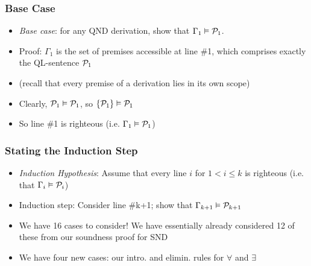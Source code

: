 \begin{frame}
\frametitle{Base Case}

\begin{itemize}

\item \emph{Base case}: for any QND derivation, show that $\Gamma_1 \vDash \mathcal{P}_1$.

\item Proof: $\Gamma_1$ is the set of premises accessible at line \#1, which comprises exactly the QL-sentence $\mathcal{P}_1$ 

\item (recall that every premise of a derivation lies in its own scope)

\item Clearly, $\mathcal{P}_1 \vDash \mathcal{P}_1 $, so $\{ \mathcal{P}_1 \} \vDash \mathcal{P}_1$

\item So line \#1 is righteous (i.e. $\Gamma_1 \vDash \mathcal{P}_1$)

\end{itemize}
\end{frame}

\begin{frame}
\frametitle{Stating the Induction Step}

\begin{itemize}

\item  \emph{Induction Hypothesis}: Assume that every line $i$ for $1 < i \leq k$ is righteous (i.e. that $\Gamma_i \vDash \mathcal{P}_i $)

\item Induction step: Consider line \#k+1; show that $\Gamma_{k+1} \vDash \mathcal{P}_{k+1}$

\item We have 16 cases to consider! We have essentially already considered 12 of these from our soundness proof for SND

\item We have four new cases: our intro. and elimin. rules for $\forall$ and $\exists$


\end{itemize}
\end{frame}


